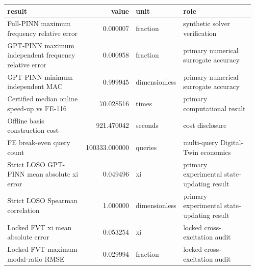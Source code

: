 \begin{tabular}{lrll}
\toprule
result & value & unit & role \\
\midrule
Full-PINN maximum frequency relative error & 0.000007 & fraction & synthetic solver verification \\
GPT-PINN maximum independent frequency relative error & 0.000958 & fraction & primary numerical surrogate accuracy \\
GPT-PINN minimum independent MAC & 0.999945 & dimensionless & primary numerical surrogate accuracy \\
Certified median online speed-up vs FE-116 & 70.028516 & times & primary computational result \\
Offline basis construction cost & 921.470042 & seconds & cost disclosure \\
FE break-even query count & 100333.000000 & queries & multi-query Digital-Twin economics \\
Strict LOSO GPT-PINN mean absolute xi error & 0.049496 & xi & primary experimental state-updating result \\
Strict LOSO Spearman correlation & 1.000000 & dimensionless & primary experimental state-updating result \\
Locked FVT xi mean absolute error & 0.053254 & xi & locked cross-excitation audit \\
Locked FVT maximum modal-ratio RMSE & 0.029994 & fraction & locked cross-excitation audit \\
\bottomrule
\end{tabular}
